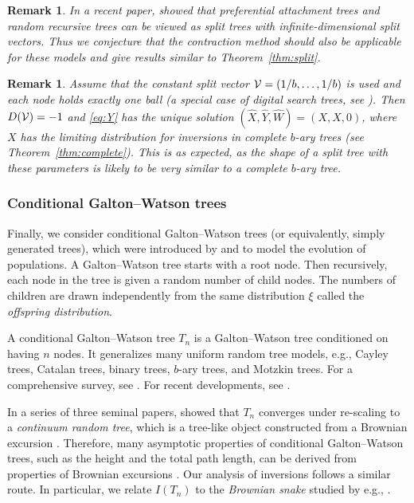 \documentclass[11pt]{article}
\newcommand{\ball}[1]{\hat{#1}}
\def\bX{\ball{X}}
\def\bY{\ball{Y}}
\def\bW{\ball{W}}
\newcommand{\bVec}{(\bX, \bY, \bW)}
\newcommand\cV{{\cal V}}
\def\Z{\mathbb{Z}}
\numberwithin{theorem}{section}
\newtheorem{remark}[theorem]{Remark}
\theoremstyle{definition}
\newcommand{\Toll}{D}
\numberwithin{equation}{section}
\newcommand{\refT}[1]{Theorem~\ref{#1}}
\begin{document}
\begin{remark}
    In a recent paper, \citet{s17} showed that preferential attachment trees and random recursive
    trees can be viewed as split trees with infinite-dimensional split vectors. Thus we conjecture
    that the contraction method should also be applicable for these models and give results similar
    to \refT{thm:split}.
\end{remark}

\begin{remark}
Assume that the 
constant 
split vector $\cV = (1/b,\dots,1/b)$ is used and each node holds exactly one
ball (a
special case of digital search trees, see \cite[Example 7]{MR1236537}).
Then $\Toll(\cV) = -1$ and
\eqref{eq:Y} has the unique solution $\bVec = (X, X, 0)$, where \(X\) has the limiting
distribution for inversions in complete $b$-ary trees (see \refT{thm:complete}). This is as expected, as the
shape of a split tree with these parameters is likely to be very similar to a complete $b$-ary tree.
\end{remark}

\subsubsection*{Conditional Galton--Watson trees}

Finally, we consider conditional Galton--Watson trees (or equivalently, simply generated
trees), which were introduced by \citet{bienayme} and \citet{watson1875} to
model the evolution of populations. A Galton--Watson tree starts with a root node. Then recursively,
each node in the tree is given a random number of child nodes. 
The numbers of children are drawn independently from the same distribution \(\xi\) called the \emph{offspring
distribution}.

A conditional Galton--Watson tree \(T_n\) is a Galton--Watson tree conditioned on having \(n\) nodes.
It generalizes many uniform random tree models, e.g., Cayley trees, Catalan trees, binary trees,
\(b\)-ary trees, and Motzkin trees. For a comprehensive survey, see \citet{j12}.
For recent developments, see \cite{cai16, dhs17, j16, k17}.

In a series of three seminal papers, \citeauthor{a91} showed that \(T_n\) converges under re-scaling to
a \emph{continuum random tree}, which is a tree-like object constructed from a Brownian excursion
\cite{MR1085326, a91, MR1207226}.  Therefore, many asymptotic properties of conditional
Galton--Watson trees, such as the height and the total path length, can be derived from properties of
Brownian excursions \cite{a91}. Our analysis of inversions follows a similar route.  In
particular, we relate \(I(T_n)\) to the \emph{Brownian snake} studied by 
e.g., \citet{jm05}.
\end{document}
